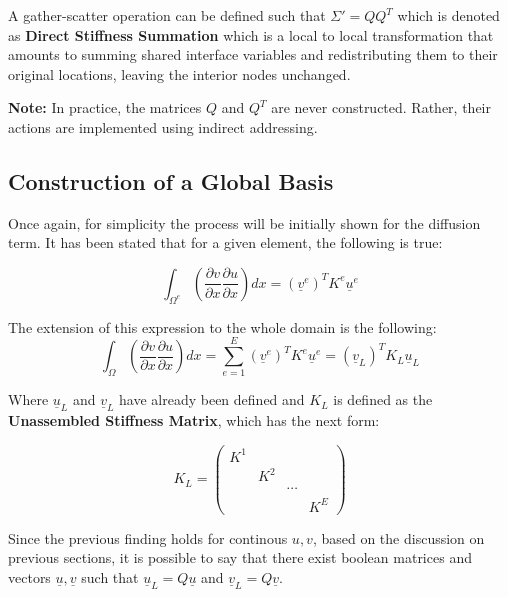 \documentclass[
  a4paper,
  10pt]{article}
\begin{document}
A gather-scatter operation can be defined such that \(\Sigma'=QQ^{T}\)
which is denoted as \textbf{Direct Stiffness Summation} which is a local
to local transformation that amounts to summing shared interface
variables and redistributing them to their original locations, leaving
the interior nodes unchanged.

\textbf{Note:} In practice, the matrices \(Q\) and \(Q^T\) are never
constructed. Rather, their actions are implemented using indirect
addressing.

\hypertarget{construction-of-a-global-basis}{%
\subsection{Construction of a Global
Basis}\label{construction-of-a-global-basis}}

Once again, for simplicity the process will be initially shown for the
diffusion term. It has been stated that for a given element, the
following is true:

\begin{equation}
\int_{\Omega^{e}} ( \frac{\partial v}{\partial x}\frac{\partial u}{\partial x})dx =(\underline{v}^{e})^{T}K^{e}\underline{u}^{e}
\end{equation}

The extension of this expression to the whole domain is the following:
\begin{equation}
    \int_{\Omega} ( \frac{\partial v}{\partial x}\frac{\partial u}{\partial x})dx = \sum_{e=1}^{E} (\underline{v}^{e})^{T}K^{e}\underline{u}^{e} = (\underline{v}_L)^{T}K_L\underline{u}_L    
\end{equation}

Where \(\underline{u}_L\) and \(\underline{v}_L\) have already been
defined and \(K_L\) is defined as the \textbf{Unassembled Stiffness
Matrix}, which has the next form:

\begin{equation}
        K_L=
        \begin{pmatrix}
        K^1 &           &        & \\
                  & K^2 &        & \\
                  &           & \cdots & \\
                  &           &        & K^{E}
        \end{pmatrix} 
\end{equation}

Since the previous finding holds for continous \(u,v\), based on the
discussion on previous sections, it is possible to say that there exist
boolean matrices and vectors \(\underline{u}, \underline{v}\) such that
\(\underline{u}_L=Q\underline{u}\) and
\(\underline{v}_L=Q\underline{v}\).
\end{document}

